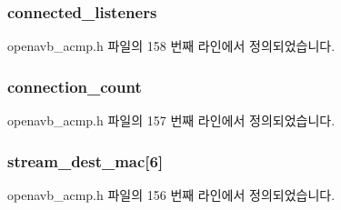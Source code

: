 \subsubsection[{\texorpdfstring{connected\+\_\+listeners}{connected_listeners}}]{ connected\+\_\+listeners}\hypertarget{structopenavb__acmp___talker_stream_info__t_aa7e3334deb22142512cb56a6ff7cb46e}{}\label{structopenavb__acmp___talker_stream_info__t_aa7e3334deb22142512cb56a6ff7cb46e}


openavb\+\_\+acmp.\+h 파일의 158 번째 라인에서 정의되었습니다.

\subsubsection[{\texorpdfstring{connection\+\_\+count}{connection_count}}]{ connection\+\_\+count}\hypertarget{structopenavb__acmp___talker_stream_info__t_ad1ff24268593562ac5896a238d895b81}{}\label{structopenavb__acmp___talker_stream_info__t_ad1ff24268593562ac5896a238d895b81}


openavb\+\_\+acmp.\+h 파일의 157 번째 라인에서 정의되었습니다.

\subsubsection[{\texorpdfstring{stream\+\_\+dest\+\_\+mac}{stream_dest_mac}}]{ stream\+\_\+dest\+\_\+mac\mbox{[}6\mbox{]}}\hypertarget{structopenavb__acmp___talker_stream_info__t_a26087f365a751a1415364bfb5e2b8a0e}{}\label{structopenavb__acmp___talker_stream_info__t_a26087f365a751a1415364bfb5e2b8a0e}


openavb\+\_\+acmp.\+h 파일의 156 번째 라인에서 정의되었습니다.

